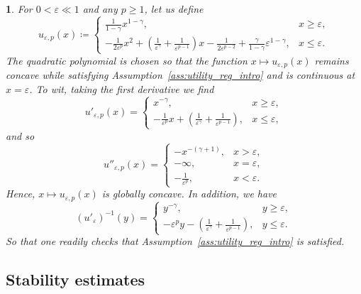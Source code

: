 \documentclass[11pt,oneside,english,reqno,dvipsnames,table]{amsart}
\numberwithin{equation}{section}
\theoremstyle{plain}
\theoremstyle{definition}
\theoremstyle{remark}
\theoremstyle{plain}
\theoremstyle{plain}
\theoremstyle{plain}
\theoremstyle{plain}
\theoremstyle{plain}
\newtheorem{ex}[thm]{\protect\examplename}
\theoremstyle{plain}
\theoremstyle{plain}
\providecommand{\examplename}{Example}
\newcommand{\eps}{\varepsilon}
\numberwithin{thm}{section}
\begin{document}
\begin{ex}
    For $0<\eps \ll 1$ and any $p\geq 1$, let us define
       \begin{equation*}
   	u_{\eps,p}(x) \coloneqq \begin{cases}
   		\frac{1}{1-\gamma}x^{1-\gamma}, & x \geq \eps,\\
   	-\frac{1}{2\eps^p}x^2 + \left(\frac{1}{\eps^\gamma}+\frac{1}{\eps^{p-1}}\right)x- \frac{1}{2\eps^{p-2}}+ \frac{\gamma}{1-\gamma}\eps^{1-\gamma},  & x\leq \eps.
   	\end{cases}
   \end{equation*}
    The quadratic polynomial is chosen so that the function $x\mapsto u_{\eps,p}(x)$ remains concave while satisfying Assumption~\ref{ass:utility_reg_intro} and is continuous at $x=\eps$. To wit, taking the first derivative we find
       \begin{equation*}
    	u'_{\eps,p}(x) = \begin{cases}
    		x^{-\gamma}, & x\geq \eps,\\
    	-\frac{1}{\eps^p}x + \left(\frac{1}{\eps^\gamma}+\frac{1}{\eps^{p-1}}\right),& x\leq \eps,
    	\end{cases}
    \end{equation*}
    and so
        \begin{equation*}
 	u''_{\eps,p}(x) = \begin{cases}
 		-x^{-(\gamma+1)}, & x> \eps,\\
 			-\infty, & x = \eps,\\
 		-\frac{1}{\eps^p},& x<\eps.
 	\end{cases}
 \end{equation*}
 Hence, $x\mapsto u_{\eps,p}(x)$ is globally concave. In addition, we have
      \begin{equation*}
    	(u'_\eps)^{-1}(y) = \begin{cases}
    	y^{-\gamma}, & y\geq \eps,\\
    	-\eps^p y - \left(\frac{1}{\eps^\gamma}+\frac{1}{\eps^{p-1}}\right),& y\leq \eps.
    \end{cases}
 \end{equation*}
 So that one readily checks that Assumption~\ref{ass:utility_reg_intro} is satisfied. 
 
\end{ex}
%
%

\subsection{Stability estimates}
\end{document}
